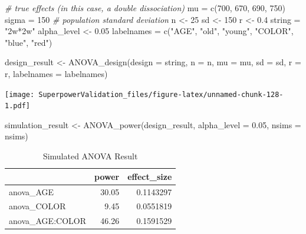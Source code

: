 \documentclass[
]{book}
\newenvironment{Shaded}{\begin{snugshade}}{\end{snugshade}}
\newcommand{\AttributeTok}[1]{\textcolor[rgb]{0.77,0.63,0.00}{#1}}
\newcommand{\CommentTok}[1]{\textcolor[rgb]{0.56,0.35,0.01}{\textit{#1}}}
\newcommand{\DecValTok}[1]{\textcolor[rgb]{0.00,0.00,0.81}{#1}}
\newcommand{\FloatTok}[1]{\textcolor[rgb]{0.00,0.00,0.81}{#1}}
\newcommand{\FunctionTok}[1]{\textcolor[rgb]{0.00,0.00,0.00}{#1}}
\newcommand{\NormalTok}[1]{#1}
\newcommand{\OtherTok}[1]{\textcolor[rgb]{0.56,0.35,0.01}{#1}}
\newcommand{\StringTok}[1]{\textcolor[rgb]{0.31,0.60,0.02}{#1}}
\begin{document}
\begin{Shaded}
\begin{Highlighting}[]
\CommentTok{\# true effects (in this case, a double dissociation)}
\NormalTok{mu }\OtherTok{=} \FunctionTok{c}\NormalTok{(}\DecValTok{700}\NormalTok{, }\DecValTok{670}\NormalTok{, }\DecValTok{690}\NormalTok{, }\DecValTok{750}\NormalTok{) }
\NormalTok{sigma }\OtherTok{=} \DecValTok{150}  \CommentTok{\# population standard deviation}
\NormalTok{n }\OtherTok{\textless{}{-}} \DecValTok{25}
\NormalTok{sd }\OtherTok{\textless{}{-}} \DecValTok{150}
\NormalTok{r }\OtherTok{\textless{}{-}} \FloatTok{0.4}
\NormalTok{string }\OtherTok{=} \StringTok{"2w*2w"}
\NormalTok{alpha\_level }\OtherTok{\textless{}{-}} \FloatTok{0.05}
\NormalTok{labelnames }\OtherTok{=} \FunctionTok{c}\NormalTok{(}\StringTok{"AGE"}\NormalTok{, }\StringTok{"old"}\NormalTok{, }\StringTok{"young"}\NormalTok{, }
               \StringTok{"COLOR"}\NormalTok{, }\StringTok{"blue"}\NormalTok{, }\StringTok{"red"}\NormalTok{)}

\NormalTok{design\_result }\OtherTok{\textless{}{-}} \FunctionTok{ANOVA\_design}\NormalTok{(}\AttributeTok{design =}\NormalTok{ string,}
                              \AttributeTok{n =}\NormalTok{ n, }
                              \AttributeTok{mu =}\NormalTok{ mu, }
                              \AttributeTok{sd =}\NormalTok{ sd, }
                              \AttributeTok{r =}\NormalTok{ r, }
                              \AttributeTok{labelnames =}\NormalTok{ labelnames)}
\end{Highlighting}
\end{Shaded}

\texttt{[image: SuperpowerValidation\_files/figure-latex/unnamed-chunk-128-1.pdf]}

\begin{Shaded}
\begin{Highlighting}[]
\NormalTok{simulation\_result }\OtherTok{\textless{}{-}} \FunctionTok{ANOVA\_power}\NormalTok{(design\_result, }
                                 \AttributeTok{alpha\_level =} \FloatTok{0.05}\NormalTok{, }
                                 \AttributeTok{nsims =}\NormalTok{ nsims)}
\end{Highlighting}
\end{Shaded}

\begin{table}[!h]

\caption{\label{tab:unnamed-chunk-130}Simulated ANOVA Result}
\centering
\begin{tabular}[t]{l|r|r}
\hline
  & power & effect\_size\\
\hline
anova\_AGE & 30.05 & 0.1143297\\
\hline
anova\_COLOR & 9.45 & 0.0551819\\
\hline
anova\_AGE:COLOR & 46.26 & 0.1591529\\
\hline
\end{tabular}
\end{table}
\end{document}
